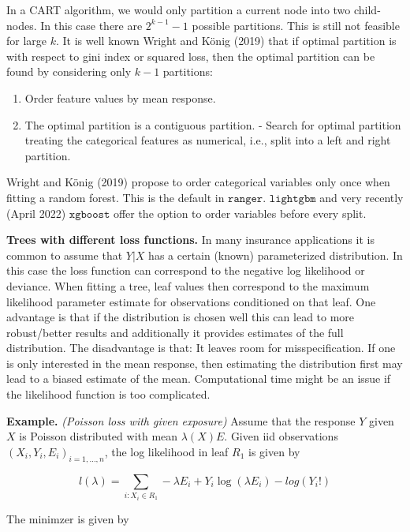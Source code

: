 \documentclass[
]{book}
\providecommand{\tightlist}{%
  \setlength{\itemsep}{0pt}\setlength{\parskip}{0pt}}
\begin{document}
In a CART algorithm, we would only partition a current node into two child-nodes. In this case there are \(2^{k - 1}-1\) possible partitions. This is still not feasible for large \(k\). It is well known Wright and König (2019) that if optimal partition is with respect to gini index or squared loss, then the optimal partition can be found by considering only \(k-1\) partitions:

\begin{enumerate}
\def\labelenumi{\arabic{enumi}.}
\tightlist
\item
  Order feature values by mean response.
\item
  The optimal partition is a contiguous partition.
  - Search for optimal partition treating the categorical features as numerical, i.e., split into a left and right partition.
\end{enumerate}

Wright and König (2019) propose to order categorical variables only once when fitting a random forest. This is the default in \(\texttt{ranger}\). \(\texttt{lightgbm}\) and very recently (April 2022) \(\texttt{xgboost}\) offer the option to order variables before every split.

\textbf{Trees with different loss functions.} In many insurance applications it is common to assume that \(Y|X\) has a certain (known) parameterized distribution. In this case the loss function can correspond to the negative log likelihood or deviance. When fitting a tree, leaf values then correspond to the maximum likelihood parameter estimate for observations conditioned on that leaf. One advantage is that if the distribution is chosen well this can lead to more robust/better results and additionally it provides estimates of the full distribution. The disadvantage is that: It leaves room for misspecification. If one is only interested in the mean response, then estimating the distribution first may lead to a biased estimate of the mean. Computational time might be an issue if the likelihood function is too complicated.

\textbf{Example.} \emph{(Poisson loss with given exposure)} Assume that the response \(Y\) given \(X\) is Poisson distributed with mean \(\lambda(X)E\). Given iid observations \((X_i,Y_i,E_i)_{i=1,\dots,n}\), the log likelihood in leaf \(R_1\) is given by

\[
l(\lambda)= \sum_{i: X_i\in R_1} -\lambda E_i+ Y_i\log(\lambda E_i)-log(Y_i!)
\]

The minimzer is given by
\end{document}
